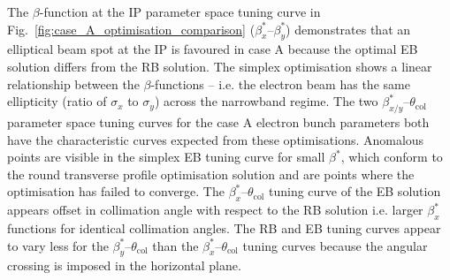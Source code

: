 \documentclass[../main.tex]{subfiles}
\begin{document}
The $\beta$-function at the IP parameter space tuning curve in Fig.~\ref{fig:case_A_optimisation_comparison} ($\beta_{x}^{*}$--$\beta_{y}^{*}$) demonstrates that an elliptical beam spot at the IP is favoured in case A because the optimal EB solution differs from the RB solution. The simplex optimisation shows a linear relationship between the $\beta$-functions -- i.e. the electron beam has the same ellipticity (ratio of $\sigma_{x}$ to $\sigma_{y}$) across the narrowband regime. The two $\beta_{x/y}^{*}$--$\theta_{\mathrm{col}}$ parameter space tuning curves for the case A electron bunch parameters both have the characteristic curves expected from these optimisations. Anomalous points are visible in the simplex EB tuning curve for small $\beta^{*}$, which conform to the round transverse profile optimisation solution and are points where the optimisation has failed to converge. The $\beta_{x}^{*}$--$\theta_{\mathrm{col}}$ tuning curve of the EB solution appears offset in collimation angle with respect to the RB solution i.e. larger $\beta_{x}^{*}$ functions for identical collimation angles. The RB and EB tuning curves appear to vary less for the $\beta_{y}^{*}$--$\theta_{\mathrm{col}}$ than the $\beta_{x}^{*}$--$\theta_{\mathrm{col}}$ tuning curves because the angular crossing is imposed in the horizontal plane.
\end{document}
